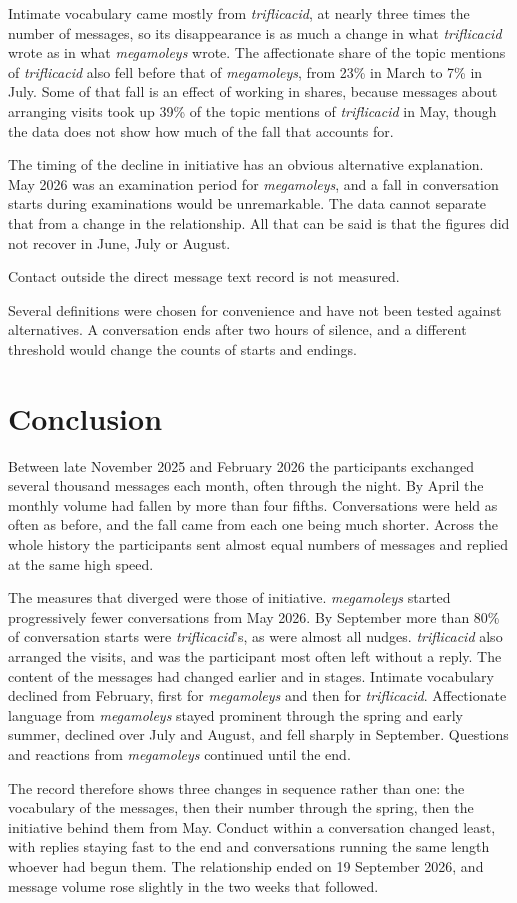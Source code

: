 \documentclass[11pt,a4paper]{article}
\newcommand{\userA}{\textit{triflicacid}}
\newcommand{\userB}{\textit{megamoleys}}
\begin{document}
Intimate vocabulary came mostly from \userA{}, at nearly three times the number of
messages, so its disappearance is as much a change in what \userA{} wrote as in what
\userB{} wrote. The affectionate share of the topic
mentions of \userA{} also fell before that of \userB{}, from 23\% in March to 7\% in
July. Some of that fall is an effect of working in shares, because messages about
arranging visits took up 39\% of the topic mentions of \userA{} in May, though the
data does not show how much of the fall that accounts for.

The timing of the decline in initiative has an obvious alternative explanation. May
2026 was an examination period for \userB{}, and a fall in conversation starts during
examinations would be unremarkable. The data cannot separate that from a change in
the relationship. All that can be said is that the figures did not recover in June,
July or August.

Contact outside the direct message text record is not measured.

Several definitions were chosen for convenience and have not been tested against
alternatives. A conversation ends after two hours of silence, and a different
threshold would change the counts of starts and endings.

\section{Conclusion}

Between late November 2025 and February 2026 the participants exchanged several
thousand messages each month, often through the night. By April the monthly volume
had fallen by more than four fifths. Conversations were held as often as before, and
the fall came from each one being much shorter. Across the whole history the
participants sent almost equal numbers of messages and replied at the same high
speed.

The measures that diverged were those of initiative. \userB{} started progressively
fewer conversations from May 2026. By September more than 80\% of conversation starts
were \userA{}'s, as were almost all nudges. \userA{} also arranged the visits, and was
the participant most often left without a reply. The content of the messages had
changed earlier and in stages. Intimate vocabulary declined from February, first for
\userB{} and then for \userA{}. Affectionate language from \userB{} stayed prominent
through the spring and early summer, declined over July and August, and fell sharply
in September. Questions and reactions from \userB{} continued until the end.

The record therefore shows three changes in sequence rather than one: the vocabulary
of the messages, then their number through the spring, then the initiative behind them
from May. Conduct within a conversation changed least, with replies staying fast to
the end and conversations running the same length whoever had begun them. The
relationship ended on 19 September 2026, and message volume rose slightly in the two
weeks that followed.
\end{document}
